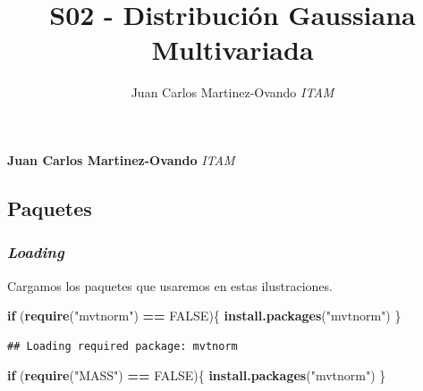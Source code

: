 \documentclass[11pt,]{article}
\title{S02 - Distribución Gaussiana Multivariada  }
\author{\Large Juan Carlos Martinez-Ovando\vspace{0.05in} \newline\normalsize\emph{ITAM}  }
\date{}
\newcommand*{\authorfont}{\fontfamily{phv}\selectfont}
\newenvironment{Shaded}{\begin{snugshade}}{\end{snugshade}}
\newcommand{\KeywordTok}[1]{\textcolor[rgb]{0.13,0.29,0.53}{\textbf{#1}}}
\newcommand{\StringTok}[1]{\textcolor[rgb]{0.31,0.60,0.02}{#1}}
\newcommand{\OtherTok}[1]{\textcolor[rgb]{0.56,0.35,0.01}{#1}}
\newcommand{\ControlFlowTok}[1]{\textcolor[rgb]{0.13,0.29,0.53}{\textbf{#1}}}
\newcommand{\OperatorTok}[1]{\textcolor[rgb]{0.81,0.36,0.00}{\textbf{#1}}}
\newcommand{\NormalTok}[1]{#1}
\begin{document}
	
%

{%
\setlength{\parindent}{0pt}
\thispagestyle{plain}
{\fontsize{18}{20}\selectfont\raggedright 
\maketitle  %

}

{
   \vskip 13.5pt\relax \normalsize\fontsize{11}{12} 
\textbf{\authorfont Juan Carlos Martinez-Ovando} \hskip 15pt \emph{\small ITAM}   

}

}






\vskip 6.5pt


\noindent  \subsection{Paquetes}\label{paquetes}

\subsubsection{\texorpdfstring{\emph{Loading}}{Loading}}\label{loading}

Cargamos los paquetes que usaremos en estas ilustraciones.

\begin{Shaded}
\begin{Highlighting}[]
\ControlFlowTok{if}\NormalTok{ (}\KeywordTok{require}\NormalTok{(}\StringTok{"mvtnorm"}\NormalTok{) }\OperatorTok{==}\StringTok{ }\OtherTok{FALSE}\NormalTok{)\{}
  \KeywordTok{install.packages}\NormalTok{(}\StringTok{"mvtnorm"}\NormalTok{)}
\NormalTok{\}}
\end{Highlighting}
\end{Shaded}

\begin{verbatim}
## Loading required package: mvtnorm
\end{verbatim}

\begin{Shaded}
\begin{Highlighting}[]
\ControlFlowTok{if}\NormalTok{ (}\KeywordTok{require}\NormalTok{(}\StringTok{"MASS"}\NormalTok{) }\OperatorTok{==}\StringTok{ }\OtherTok{FALSE}\NormalTok{)\{}
  \KeywordTok{install.packages}\NormalTok{(}\StringTok{"mvtnorm"}\NormalTok{)}
\NormalTok{\}}
\end{Highlighting}
\end{Shaded}
\end{document}
